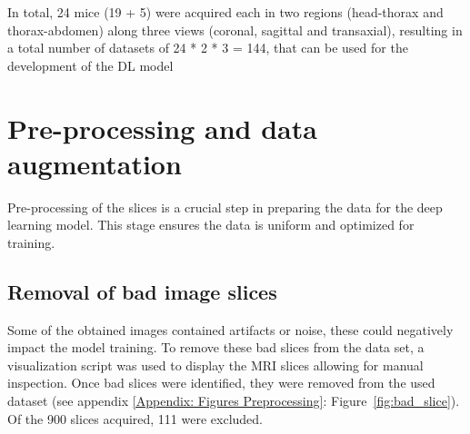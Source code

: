 \documentclass[twocolumn]{article}
\begin{document}
\begin{table}[h]
\centering
\caption{\label{tab:mri} Overview of the scan and image parameters used to acquire high- and low-resolution data of mice.}
\end{table}

In total, 24 mice (19 + 5) were acquired each in two regions (head-thorax and thorax-abdomen) along three views (coronal, sagittal and transaxial), resulting in a total number of datasets of 24 * 2 * 3 = 144, that can be used for the development of the DL model


\section{Pre-processing and data augmentation}

Pre-processing of the slices is a crucial step in preparing the data for the deep learning model. 
This stage ensures the data is uniform and optimized for training. 

\subsection{Removal of bad image slices}

Some of the obtained images contained artifacts or noise, these could negatively impact the model training. 
To remove these bad slices from the data set, a visualization script was used to display the MRI slices allowing for manual inspection. 
Once bad slices were identified, they were removed from the used dataset (see appendix \ref{Appendix: Figures Preprocessing}: Figure~\ref{fig:bad_slice}). Of the 900 slices acquired, 111 were excluded.
\end{document}
